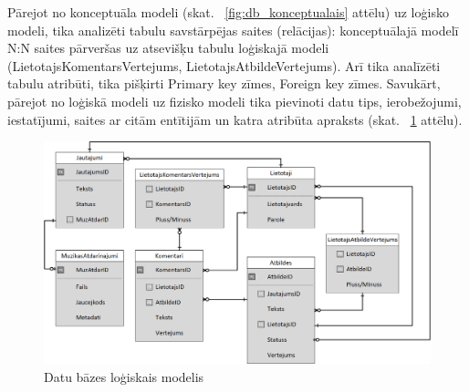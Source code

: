\documentclass[12pt]{article}
\begin{document}
Pārejot no konceptuāla modeli (skat. ~\ref{fig:db_konceptualais} attēlu) uz loģisko modeli, tika analizēti tabulu savstārpējas saites (relācijas): konceptuālajā modelī N:N saites pārveršas uz atsevišķu tabulu loģiskajā modeli (LietotajsKomentarsVertejums, LietotajsAtbildeVertejums). Arī tika analīzēti tabulu atribūti, tika pišķirti Primary key zīmes, Foreign key zīmes.
Savukārt, pārejot no loģiskā modeli uz fizisko modeli tika pievinoti datu tips, ierobežojumi, iestatījumi, saites ar citām entītijām un katra atribūta apraksts (skat. ~\ref{fig:db_logiskais} attēlu).

\begin{figure}[H]
\begin{center}
	\includegraphics[scale=0.35]{DB_logical.png}
	\caption{Datu bāzes loģiskais modelis}
	\label{fig:db_logiskais}
\end{center}
\end{figure}
\end{document}
